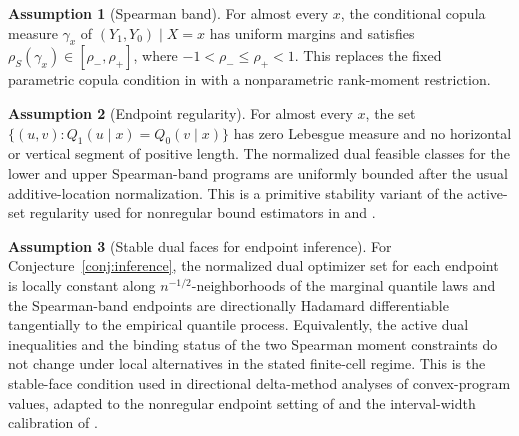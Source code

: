 \documentclass[11pt]{article}
\theoremstyle{definition}
\newtheorem{assumption}{Assumption}
\theoremstyle{plain}
\theoremstyle{remark}
\begin{document}
\begin{assumption}[Spearman band]\label{ass:band}
For almost every \(x\), the conditional copula measure \(\gamma_x\) of \((Y_1,Y_0)\mid X=x\) has uniform margins and satisfies \(\rho_S(\gamma_x)\in[\rho_-,\rho_+]\), where \(-1<\rho_-\le\rho_+<1\).  This replaces the fixed parametric copula condition in \citet{HeLi2026OrdinalCopula} with a nonparametric rank-moment restriction.
\end{assumption}

\begin{assumption}[Endpoint regularity]\label{ass:regular}
For almost every \(x\), the set \(\{(u,v):Q_1(u\mid x)=Q_0(v\mid x)\}\) has zero Lebesgue measure and no horizontal or vertical segment of positive length.  The normalized dual feasible classes for the lower and upper Spearman-band programs are uniformly bounded after the usual additive-location normalization.  This is a primitive stability variant of the active-set regularity used for nonregular bound estimators in \citet{FanPark2010DTEBounds} and \citet{Stoye2009MoreCI}.
\end{assumption}

\begin{assumption}[Stable dual faces for endpoint inference]\label{ass:stable-dual}
For Conjecture~\ref{conj:inference}, the normalized dual optimizer set for each endpoint is locally constant along \(n^{-1/2}\)-neighborhoods of the marginal quantile laws and the Spearman-band endpoints are directionally Hadamard differentiable tangentially to the empirical quantile process.  Equivalently, the active dual inequalities and the binding status of the two Spearman moment constraints do not change under local alternatives in the stated finite-cell regime.  This is the stable-face condition used in directional delta-method analyses of convex-program values, adapted to the nonregular endpoint setting of \citet{FanPark2010DTEBounds} and the interval-width calibration of \citet{Stoye2009MoreCI}.
\end{assumption}
\end{document}
